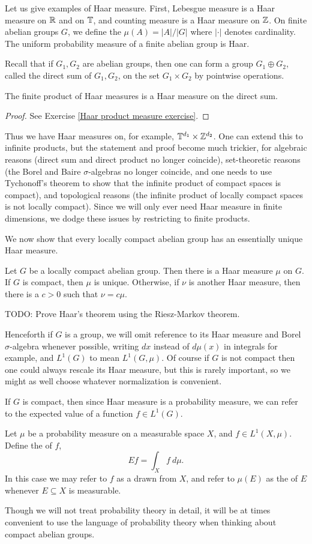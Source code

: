 Let us give examples of Haar measure.
First, Lebesgue measure is a Haar measure on $\mathbb{R}$ and on $\mathbb{T}$, and counting measure is a Haar measure on $\mathbb{Z}$.
On finite abelian groups $G$, we define the  $\mu(A) = |A|/|G|$ where $|\cdot|$ denotes cardinality.
The uniform probability measure of a finite abelian group is Haar.

Recall that if $G_1, G_2$ are abelian groups, then one can form a group $G_1 \oplus G_2$, called the direct sum of $G_1,G_2$, on the set $G_1 \times G_2$ by pointwise operations.
\begin{lemma}
\label{Haar product measure}
The finite product of Haar measures is a Haar measure on the direct sum.
\end{lemma}
\begin{proof}
See Exercise \ref{Haar product measure exercise}.
\end{proof}
Thus we have Haar measures on, for example, $\mathbb{T}^{d_1} \times \mathbb{Z}^{d_2}$.
One can extend this to infinite products, but the statement and proof become much trickier, for algebraic reasons (direct sum and direct product no longer coincide), set-theoretic reasons (the Borel and Baire $\sigma$-algebras no longer coincide, and one needs to use Tychonoff's theorem to show that the infinite product of compact spaces is compact), and topological reasons (the infinite product of locally compact spaces is not locally compact).
Since we will only ever need Haar measure in finite dimensions, we dodge these issues by restricting to finite products.

We now show that every locally compact abelian group has an essentially unique Haar measure.
\begin{theorem}
Let $G$ be a locally compact abelian group.
Then there is a Haar measure $\mu$ on $G$.
If $G$ is compact, then $\mu$ is unique.
Otherwise, if $\nu$ is another Haar measure, then there is a $c > 0$ such that $\nu = c\mu$.
\end{theorem}
TODO: Prove Haar's theorem using the Riesz-Markov theorem.

Henceforth if $G$ is a group, we will omit reference to its Haar measure and Borel $\sigma$-algebra whenever possible, writing $dx$ instead of $d\mu(x)$ in integrals for example, and $L^1(G)$ to mean $L^1(G, \mu)$.
Of course if $G$ is not compact then one could always rescale its Haar measure, but this is rarely important, so we might as well choose whatever normalization is convenient.

If $G$ is compact, then since Haar measure is a probability measure, we can refer to the expected value of a function $f \in L^1(G)$.
\begin{definition}
Let $\mu$ be a probability measure on a measurable space $X$, and $f \in L^1(X, \mu)$.
Define the  of $f$,
\[Ef = \int_{X} f~d\mu.\]
In this case we may refer to $f$ as a  drawn from $X$, and refer to $\mu(E)$ as the  of $E$ whenever $E \subseteq X$ is measurable.
\end{definition}
Though we will not treat probability theory in detail, it will be at times convenient to use the language of probability theory when thinking about compact abelian groups.

